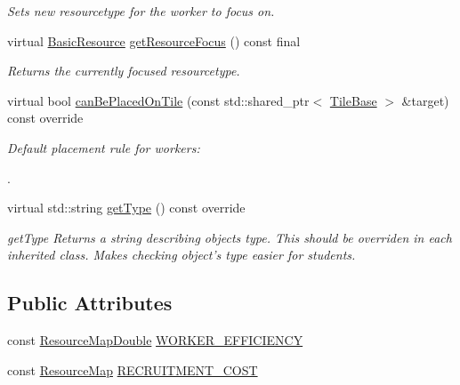\begin{DoxyCompactItemize}
\begin{DoxyCompactList}\small\item\em Sets new resourcetype for the worker to focus on. \end{DoxyCompactList}\item 
virtual \hyperlink{namespaceCourse_a02d49c04029594d4adba79b84bb85f65}{Basic\-Resource} \hyperlink{classCourse_1_1WorkerBase_ac73fff2a6c99a353b80ea67425d5d545}{get\-Resource\-Focus} () const final
\begin{DoxyCompactList}\small\item\em Returns the currently focused resourcetype. \end{DoxyCompactList}\item 
virtual bool \hyperlink{classCourse_1_1WorkerBase_ad80874970ab91bca95b9d3f959e838d2}{can\-Be\-Placed\-On\-Tile} (const std\-::shared\-\_\-ptr$<$ \hyperlink{classCourse_1_1TileBase}{Tile\-Base} $>$ \&target) const override
\begin{DoxyCompactList}\small\item\em Default placement rule for workers\-:\par
. \end{DoxyCompactList}\item 
virtual std\-::string \hyperlink{classCourse_1_1WorkerBase_afe6049810eec47fffe2c2a7334564ef9}{get\-Type} () const override
\begin{DoxyCompactList}\small\item\em get\-Type Returns a string describing objects type. This should be overriden in each inherited class. Makes checking object's type easier for students. \end{DoxyCompactList}\end{DoxyCompactItemize}
\subsection*{Public Attributes}
\begin{DoxyCompactItemize}
\item 
const \hyperlink{namespaceCourse_a0b96bae1a664dde34efbb1b42dea615e}{Resource\-Map\-Double} \hyperlink{classCourse_1_1WorkerBase_ad20bcd4fba20ad9d287860cdaeedbcca}{W\-O\-R\-K\-E\-R\-\_\-\-E\-F\-F\-I\-C\-I\-E\-N\-C\-Y}
\item 
const \hyperlink{namespaceCourse_ab9a46ed9cd00485e318e5731ea2f78d9}{Resource\-Map} \hyperlink{classCourse_1_1WorkerBase_a0734e9b62296511492aca7c2ce531197}{R\-E\-C\-R\-U\-I\-T\-M\-E\-N\-T\-\_\-\-C\-O\-S\-T}
\end{DoxyCompactItemize}
